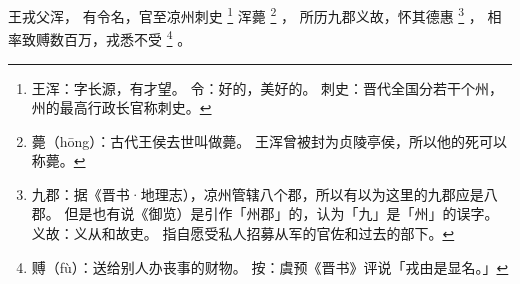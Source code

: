 
\switchcolumn*[\section{}]

王戎父浑，
有令名，官至凉州刺史%
\footnote{%
    王浑：字长源，有才望。
    令：好的，美好的。
    刺史：晋代全国分若干个州，州的最高行政长官称刺史。
}%
浑薨%
\footnote{%
    薨（hōng）：古代王侯去世叫做薨。
                王浑曾被封为贞陵亭侯，所以他的死可以称薨。
}%
，
所历九郡义故，怀其德惠%
\footnote{%
    九郡：据《晋书·地理志），凉州管辖八个郡，所以有以为这里的九郡应是八郡。
          但是也有说《御览）是引作「州郡」的，认为「九」是「州」的误字。
    义故：义从和故吏。
          指自愿受私人招募从军的官佐和过去的部下。
}%
，
相率致赙数百万，戎悉不受%
\footnote{%
    赙（fù）：送给别人办丧事的财物。
    按：虞预《晋书》评说「戎由是显名。」
}%
。

\switchcolumn




